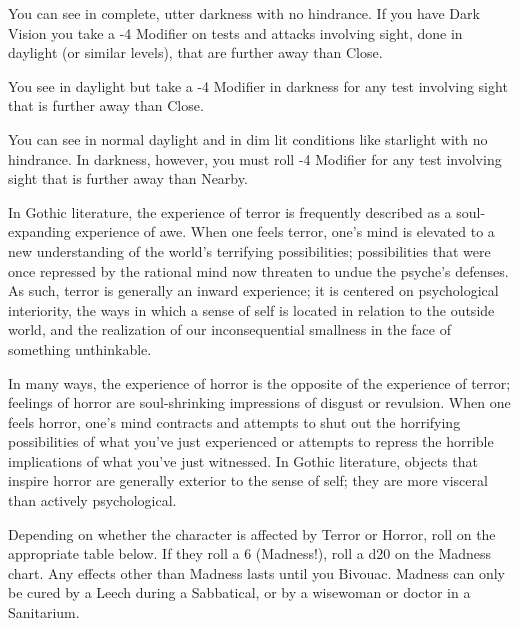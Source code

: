 {  You can see in complete, utter darkness with no hindrance.  If you have Dark Vision you take a -4 Modifier on tests and attacks involving sight, done in daylight (or similar levels), that are further away than Close. 


  You see in daylight but take a -4 Modifier in darkness for any test involving sight that is further away than Close. 


  You can see in normal daylight and in dim lit conditions like starlight with no hindrance. In darkness, however, you must roll -4 Modifier for any test involving sight that is further away than Nearby.


   

  In Gothic literature, the experience of terror is frequently described as a soul-expanding experience of awe. When one feels terror, one's mind is elevated to a new understanding of the world's terrifying possibilities; possibilities that were once repressed by the rational mind now threaten to undue the psyche's defenses. As such, terror is generally an inward experience; it is centered on psychological interiority, the ways in which a sense of self is located in relation to the outside world, and the realization of our inconsequential smallness in the face of something unthinkable.

  In many ways, the experience of horror is the opposite of the experience of terror; feelings of horror are soul-shrinking impressions of disgust or revulsion. When one feels horror, one's mind contracts and attempts to shut out the horrifying possibilities of what you've just experienced or attempts to repress the horrible implications of what you've just witnessed. In Gothic literature, objects that inspire horror are generally exterior to the sense of self; they are more visceral than actively psychological.


  Depending on whether the character is affected by Terror or Horror, roll on the appropriate table below.  If they roll a 6 (Madness!), roll a d20 on the Madness chart.  Any effects other than Madness lasts until you Bivouac. Madness can only be cured by a Leech during a Sabbatical, or by a wisewoman or doctor in a Sanitarium. 

}
